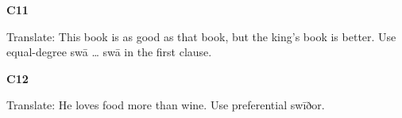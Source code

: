 \par\begin{minipage}{\linewidth}\raggedright
\textbf{C11}

Translate: This book is as good as that book, but the king’s book is better. Use equal-degree swā … swā in the first clause.

\end{minipage}\par\addvspace{4pt}

\par\begin{minipage}{\linewidth}\raggedright
\textbf{C12}

Translate: He loves food more than wine. Use preferential swīðor.

\end{minipage}\par\addvspace{4pt}


